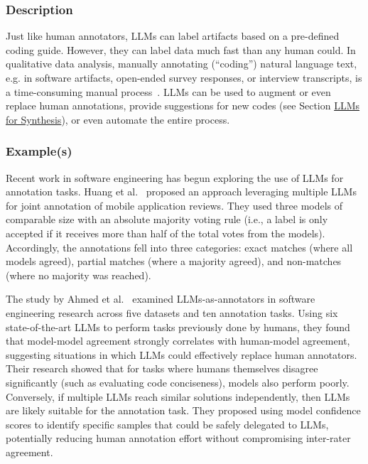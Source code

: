 \subsubsection{Description}

Just like human annotators, LLMs can label artifacts based on a pre-defined coding guide.
However, they can label data much fast than any human could. 
In qualitative data analysis, manually annotating (``coding'') natural language text, e.g. in software artifacts, open-ended survey responses, or interview transcripts, is a time-consuming manual process~\cite{DBLP:journals/ase/BanoHZT24}.
LLMs can be used to augment or even replace human annotations, provide suggestions for new codes (see Section \href{/study-types/#llms-for-synthesis}{LLMs for Synthesis}), or even automate the entire process.

\subsubsection{Example(s)}

Recent work in software engineering has begun exploring the use of LLMs for annotation tasks.
Huang et al.~\cite{Huang2023Enhancing} proposed an approach leveraging multiple LLMs for joint annotation of mobile application reviews. 
They used three models of comparable size with an absolute majority voting rule (i.e., a label is only accepted if it receives more than half of the total votes from the models). %
Accordingly, the annotations fell into three categories: exact matches (where all models agreed), partial matches (where a majority agreed), and non-matches (where no majority was reached).

The study by Ahmed et al.~\cite{Ahmed2025} examined LLMs-as-annotators in software engineering research across five datasets and ten annotation tasks. Using six state-of-the-art LLMs to perform tasks previously done by humans, they found that model-model agreement strongly correlates with human-model agreement, suggesting situations in which LLMs could effectively replace human annotators. Their research showed that for tasks where humans themselves disagree significantly (such as evaluating code conciseness), models also perform poorly. Conversely, if multiple LLMs reach similar solutions independently, then LLMs are likely suitable for the annotation task. They proposed using model confidence scores to identify specific samples that could be safely delegated to LLMs, potentially reducing human annotation effort without compromising inter-rater agreement.

